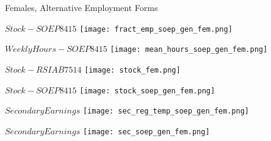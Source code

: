 \documentclass{beamer}
\begin{document}
\begin{frame}{Females, Alternative Employment Forms}
\begin{minipage}[b]{0.3\textwidth}{$Stock - SOEP8415$}
\centering
\texttt{[image: fract\_emp\_soep\_gen\_fem.png]}
\end{minipage}
\begin{minipage}[b]{0.3\textwidth}{$Weekly Hours - SOEP8415$}
\centering
\texttt{[image: mean\_hours\_soep\_gen\_fem.png]}
\end{minipage}
\begin{minipage}[b]{0.3\textwidth}{$Stock - RSIAB7514$}
\centering
\texttt{[image: stock\_fem.png]}
\end{minipage}
\begin{minipage}[b]{0.3\textwidth}{$Stock - SOEP8415$}
\centering
\texttt{[image: stock\_soep\_gen\_fem.png]}
\end{minipage}
\begin{minipage}[b]{0.3\textwidth}{$Secondary Earnings$}
\centering
\texttt{[image: sec\_reg\_temp\_soep\_gen\_fem.png]}
\end{minipage}
\begin{minipage}[b]{0.3\textwidth}{$Secondary Earnings$}
\centering
\texttt{[image: sec\_soep\_gen\_fem.png]}
\end{minipage}
\end{frame}

\end{document}
